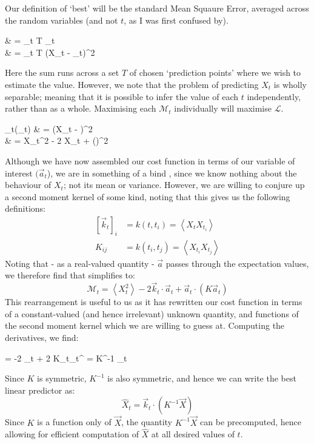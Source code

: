 \documentclass{article}
\def\llangle{\left\langle}
\def\rrangle{\right\rangle}
\newcommand\E[1]{\llangle #1 \rrangle}
\begin{document}
		Our definition of `best' will be the standard Mean Squaure Error, averaged across the random variables (and not $t$, as I was first confused by). 
		
		\begin{spalign}
			 & = \sum_{t \in T} _t
			\\
			& = \sum_{t \in T} \langle (X_t - _t)^2 \rangle \label{E:GlobalLagrangian}
		\end{spalign}
		Here the sum runs across a set $T$ of chosen `prediction points' where we wish to estimate the value. However, we note that the problem of predicting $X_t$ is wholly separable; meaning that it is possible to infer the value of each $t$ independently, rather than as a whole. Maximising each $\mathcal{M}_t$ individually will maximise $\mathcal{L}$.
		\begin{spalign}
			_t(_t) & = \E{\left(X_t -  \cdot {}\right)^2}
			\\
			& = \E{X_t^2} - 2  \cdot \E{X_t \cdot {}} + \E{(\cdot\vec{X})^2} \label{E:NastyEq}
		\end{spalign}
		Although we have now assembled our cost function in terms of our variable of interest $(\vec{a}_t$), we are in something of a bind	, since we know nothing about the behaviour of $X_t$; not its mean or variance. However, we are willing to conjure up a second moment kernel of some kind, noting that this gives us the following definitions:
		\begin{align}
			\left[\vec{k}_t \right]_i & = k(t,t_i) = \E{X_t X_{t_i}}
			\\
			K_{ij} & = k(t_i, t_j) = \E{X_{t_i} X_{t_j}}
		\end{align}
		\def\a{\vec{a}_t}
		Noting that - as a real-valued quantity - $\vec{a}$ passes through the expectation values, we therefore find that  simplifies to:
		\begin{equation}
			\mathcal{M}_t = \E{X_t^2} - 2 \vec{k}_t \cdot \a + \a \cdot \left( K \a\right) \label{E:BLP_Lagrangian}
		\end{equation}
		This rearrangement is useful to us as it has rewritten our cost function in terms of a constant-valued (and hence irrelevant) unknown quantity, and functions of the second moment kernel which we are willing to guess at. Computing the derivatives, we find:
		\begin{spalign}
			\pdiv{\mathcal{M}_t}{\a} = -2 _t + 2 K\a \LLR \a^ = K^{-1} \vec{k}_t
		\end{spalign}
		Since $K$ is symmetric, $K^{-1}$ is also symmetric, and hence we can write the best linear predictor as:
		\begin{equation}
			\hat{X}_t = _t \cdot \left( K^{-1} \vec{X} \right)
		\end{equation}
		Since $K$ is a function only of $\vec{X}$, the quantity $K^{-1} \vec{X}$ can be precomputed, hence allowing for efficient computation of $\hat{X}$ at all desired values of $t$. 
\end{document}
